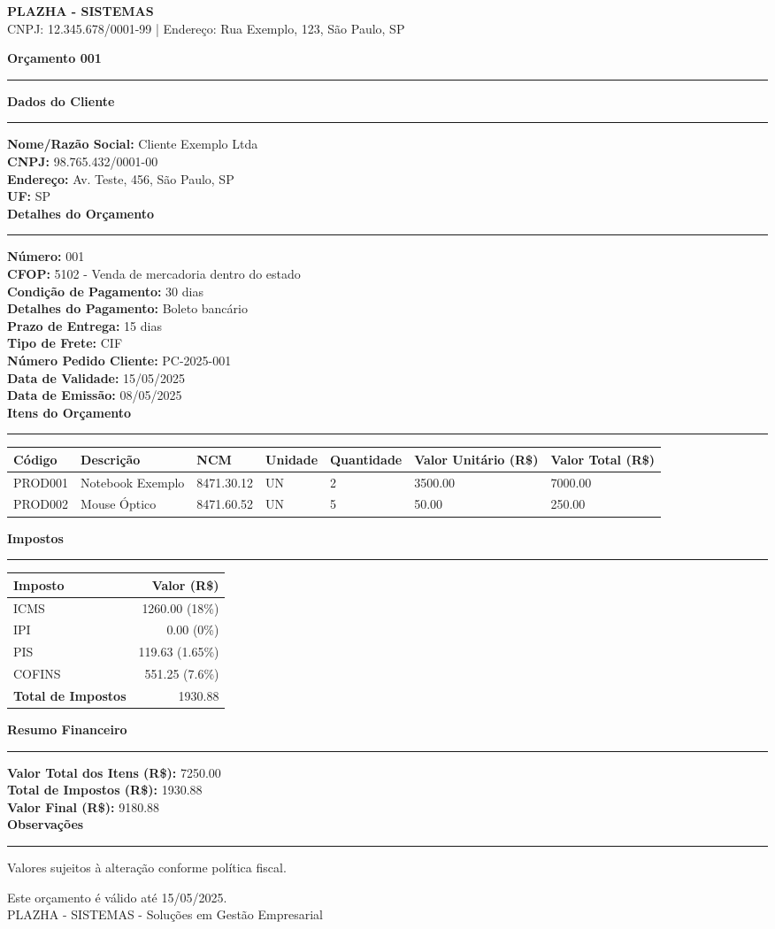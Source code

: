 \documentclass[a4paper,12pt]{article}
\newcommand{\sectiontitle}[1]{\vspace{10pt}\noindent\textbf{\large #1}\vspace{5pt}\hrule\vspace{5pt}}
\newcommand{\field}[2]{\noindent\textbf{#1:} #2 \\}
\begin{document}
\begin{center}
    \textbf{\LARGE PLAZHA - SISTEMAS} \\
    \vspace{5pt}
    \small CNPJ: 12.345.678/0001-99 | Endereço: Rua Exemplo, 123, São Paulo, SP \\
    \vspace{10pt}
\end{center}

\sectiontitle{Orçamento 001}

\sectiontitle{Dados do Cliente}
\field{Nome/Razão Social}{Cliente Exemplo Ltda}
\field{CNPJ}{98.765.432/0001-00}
\field{Endereço}{Av. Teste, 456, São Paulo, SP}
\field{UF}{SP}

\sectiontitle{Detalhes do Orçamento}
\field{Número}{001}
\field{CFOP}{5102 - Venda de mercadoria dentro do estado}
\field{Condição de Pagamento}{30 dias}
\field{Detalhes do Pagamento}{Boleto bancário}
\field{Prazo de Entrega}{15 dias}
\field{Tipo de Frete}{CIF}
\field{Número Pedido Cliente}{PC-2025-001}
\field{Data de Validade}{15/05/2025}
\field{Data de Emissão}{08/05/2025}

\sectiontitle{Itens do Orçamento}
\begin{longtable}{p{2cm} p{4cm} p{2cm} p{2cm} p{2cm} p{2cm} p{2cm}}
    \toprule
    \textbf{Código} & \textbf{Descrição} & \textbf{NCM} & \textbf{Unidade} & \textbf{Quantidade} & \textbf{Valor Unitário (R\$)} & \textbf{Valor Total (R\$)} \\
    \midrule
    \endhead
    PROD001 & Notebook Exemplo & 8471.30.12 & UN & 2 & 3500.00 & 7000.00 \\
    PROD002 & Mouse Óptico & 8471.60.52 & UN & 5 & 50.00 & 250.00 \\
    \bottomrule
\end{longtable}

\sectiontitle{Impostos}
\begin{tabular}{l r}
    \toprule
    \textbf{Imposto} & \textbf{Valor (R\$)} \\
    \midrule
    ICMS & 1260.00 (18\%) \\
    IPI & 0.00 (0\%) \\
    PIS & 119.63 (1.65\%) \\
    COFINS & 551.25 (7.6\%) \\
    \midrule
    \textbf{Total de Impostos} & 1930.88 \\
    \bottomrule
\end{tabular}

\sectiontitle{Resumo Financeiro}
\field{Valor Total dos Itens (R\$)}{7250.00}
\field{Total de Impostos (R\$)}{1930.88}
\field{Valor Final (R\$)}{9180.88}

\sectiontitle{Observações}
Valores sujeitos à alteração conforme política fiscal.

\vspace{20pt}
\begin{center}
    \small Este orçamento é válido até 15/05/2025. \\
    \small PLAZHA - SISTEMAS - Soluções em Gestão Empresarial
\end{center}
\end{document}
